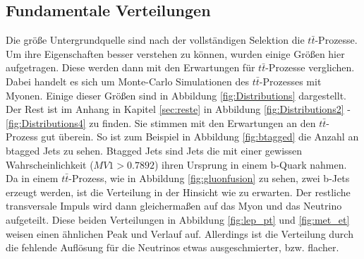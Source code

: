 \subsection{Fundamentale Verteilungen}

Die größe Untergrundquelle sind nach der vollständigen Selektion die $t\bar{t}$-Prozesse.
Um ihre Eigenschaften besser verstehen zu können, wurden einige Größen hier aufgetragen.
Diese werden dann mit den Erwartungen für $t\bar{t}$-Prozesse verglichen.
Dabei handelt es sich um Monte-Carlo Simulationen des $t\bar{t}$-Prozesses mit Myonen.
Einige dieser Größen sind in Abbildung \ref{fig:Distributions} dargestellt.
Der Rest ist im Anhang in Kapitel \ref{sec:reste} in Abbildung \ref{fig:Distributions2} - \ref{fig:Distributions4} zu finden.
Sie stimmen mit den Erwartungen an den $t\bar{t}$-Prozess gut überein.
So ist zum Beispiel in Abbildung \ref{fig:btagged} die Anzahl an btagged Jets zu sehen.
Btagged Jets sind Jets die mit einer gewissen Wahrscheinlichkeit ($MV1 > 0.7892$) ihren Ursprung in einem b-Quark nahmen.
Da in einem $t\bar{t}$-Prozess, wie in Abbildung \ref{fig:gluonfusion} zu sehen, zwei b-Jets erzeugt werden, ist die Verteilung in der Hinsicht wie zu erwarten.
Der restliche transversale Impuls wird dann gleichermaßen auf das Myon und das Neutrino aufgeteilt.
Diese beiden Verteilungen in Abbildung \ref{fig:lep_pt} und \ref{fig:met_et} weisen einen ähnlichen Peak und Verlauf auf.
Allerdings ist die Verteilung durch die fehlende Auflösung für die Neutrinos etwas ausgeschmierter, bzw. flacher.

